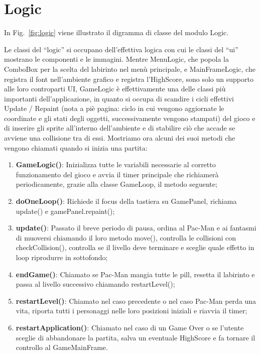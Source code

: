 \documentclass[12pt,a4paper]{report}
\begin{document}
\section{Logic}\label{se:arch.logic}
In Fig.~\ref{fig:logic} viene illustrato il digramma di classe del modulo Logic.\newline

Le classi del “logic” si occupano dell'effettiva logica con cui le classi del “ui” mostrano le componenti e le immagini. Mentre MenuLogic, che popola la ComboBox per la scelta del labirinto nel menù principale, e MainFrameLogic, che registra il font nell’ambiente grafico e registra l’HighScore, sono solo un supporto alle loro controparti UI, GameLogic è effettivamente una delle classi più importanti dell’applicazione, in quanto si occupa di scandire i cicli effettivi Update / Repaint (nota a piè pagina: ciclo in cui vengono aggiornate le coordinate e gli stati degli oggetti, successivamente vengono stampati) del gioco e di inserire gli sprite all’interno dell’ambiente e di stabilire ciò che accade se avviene una collisione tra di essi. Mostriamo ora alcuni dei suoi metodi che vengono chiamati quando si inizia una partita:
\begin{enumerate}
 \item \textbf{GameLogic()}: Inizializza tutte le variabili necessarie al corretto funzionamento del gioco e avvia il timer principale che richiamerà periodicamente, grazie alla classe GameLoop, il metodo seguente;
 \item \textbf{doOneLoop()}: Richiede il focus della tastiera su GamePanel, richiama update() e gamePanel.repaint();
 \item \textbf{update()}: Passato il breve periodo di pausa, ordina al Pac-Man e ai fantasmi di muoversi chiamando il loro metodo move(), controlla le collisioni con checkCollision(), controlla se il livello deve terminare e sceglie quale effetto in loop riprodurre in sottofondo;
 \item \textbf{endGame()}: Chiamato se Pac-Man mangia tutte le pill, resetta il labirinto e passa al livello successivo chiamando restartLevel();
 \item \textbf{restartLevel()}: Chiamato nel caso precedente o nel caso Pac-Man perda una vita, riporta tutti i personaggi nelle loro posizioni iniziali e riavvia il timer;
 \item \textbf{restartApplication()}: Chiamato nel caso di un Game Over o se l’utente sceglie di abbandonare la partita, salva un eventuale HighScore e fa tornare il controllo al GameMainFrame.
\end{enumerate}
\end{document}
